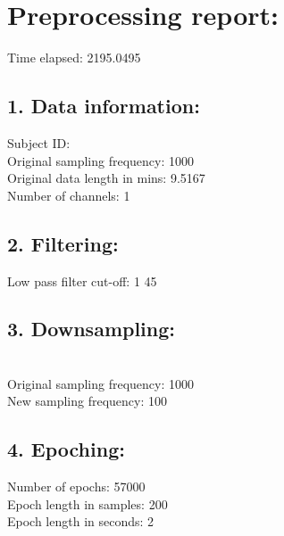 \documentclass[10pt,a4paper,oneside]{report}
\begin{document}
\author{Veronika Shamova}
\date{\taday}
\section*{Preprocessing report:}
Time elapsed:  2195.0495\\ 
\subsection*{1. Data information:}
Subject ID: 
\\ Original sampling frequency: 1000 
\\ Original data length in mins: 9.5167 
\\ Number of channels: 1 
\subsection*{2. Filtering:}
Low pass filter cut-off: 1  45
\subsection*{3. Downsampling:}
\\ Original sampling frequency: 1000
\\ New sampling frequency: 100
\subsection*{4. Epoching:}
Number of epochs: 57000 
\\ Epoch length in samples: 200 
\\ Epoch length in seconds: 2 
\end{document}
